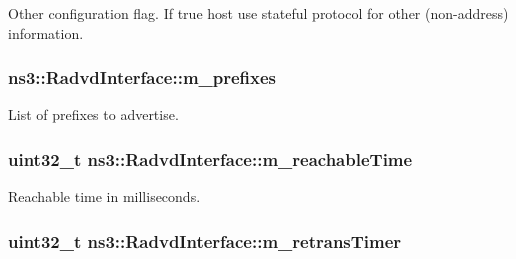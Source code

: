 Other configuration flag. If true host use stateful protocol for other (non-\/address) information. 

\subsubsection[{\texorpdfstring{m\+\_\+prefixes}{m_prefixes}}]{ ns3\+::\+Radvd\+Interface\+::m\+\_\+prefixes\hspace{0.3cm}{\ttfamily [private]}}\hypertarget{classns3_1_1RadvdInterface_a891bc9c1538359dd54d3b168601eb017}{}\label{classns3_1_1RadvdInterface_a891bc9c1538359dd54d3b168601eb017}


List of prefixes to advertise. 

\subsubsection[{\texorpdfstring{m\+\_\+reachable\+Time}{m_reachableTime}}]{\setlength{\rightskip}{0pt plus 5cm}uint32\+\_\+t ns3\+::\+Radvd\+Interface\+::m\+\_\+reachable\+Time\hspace{0.3cm}{\ttfamily [private]}}\hypertarget{classns3_1_1RadvdInterface_a2545ba2a8e79e1fa0ffdc153011b8d20}{}\label{classns3_1_1RadvdInterface_a2545ba2a8e79e1fa0ffdc153011b8d20}


Reachable time in milliseconds. 

\subsubsection[{\texorpdfstring{m\+\_\+retrans\+Timer}{m_retransTimer}}]{\setlength{\rightskip}{0pt plus 5cm}uint32\+\_\+t ns3\+::\+Radvd\+Interface\+::m\+\_\+retrans\+Timer\hspace{0.3cm}{\ttfamily [private]}}\hypertarget{classns3_1_1RadvdInterface_a7d4c8887ded7cf251aae36e9061965f0}{}\label{classns3_1_1RadvdInterface_a7d4c8887ded7cf251aae36e9061965f0}


